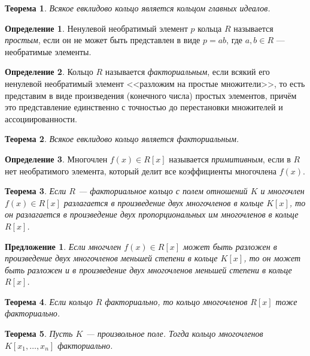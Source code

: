 \documentclass[a4paper]{article}
\theoremstyle{plain}
\newtheorem*{theorem}{Теорема}
\newtheorem{proposal}{Предложение}
\theoremstyle{definition}
\newtheorem{definition}{Определение}
\numberwithin{definition}{section}
\numberwithin{proposal}{section}
\begin{document}
\begin{theorem}
Всякое евклидово кольцо является кольцом главных идеалов.
\end{theorem}

\begin{definition}
Ненулевой необратимый элемент \(p\) кольца \(R\) называется \emph{простым}, если он не может быть представлен в виде \(p = ab\), где \(a, b \in R\) --- необратимые элементы.
\end{definition}

\begin{definition}
Кольцо \(R\) называется \emph{факториальным}, если всякий его ненулевой необратимый элемент <<разложим на простые множители>>, то есть представим в виде произведения (конечного числа) простых элементов, причём это представление единственно с точностью до перестановки множителей и ассоциированности.
\end{definition}

\begin{theorem}
Всякое евклидово кольцо является факториальным.
\end{theorem}

\begin{definition}
Многочлен \(f(x) \in R[x]\) называется \emph{примитивным}, если в \(R\) нет необратимого элемента, который делит все коэффициенты многочлена \(f(x)\).
\end{definition}

\begin{theorem}
Если \(R\) --- факториальное кольцо с полем отношений \(K\) и многочлен \(f(x) \in R[x]\) разлагается в произведение двух многочленов в кольце \(K[x]\), то он разлагается в произведение двух пропорциональных им многочленов в кольце \(R[x]\).
\end{theorem}

\begin{proposal}
Если многчлен \(f(x) \in R[x]\) может быть разложен в произведение двух многочленов меньшей степени в кольце \(K[x]\), то он может быть разложен и в произведение двух многочленов меньшей степени в кольце \(R[x]\).
\end{proposal}

\begin{theorem}
Если кольцо \(R\) факториально, то кольцо многочленов \(R[x]\) тоже факториально.
\end{theorem}

\begin{theorem}
Пусть \(K\) --- произвольное поле. Тогда кольцо многочленов \(K[x_1, \dots, x_n]\) факториально.
\end{theorem}
\end{document}
